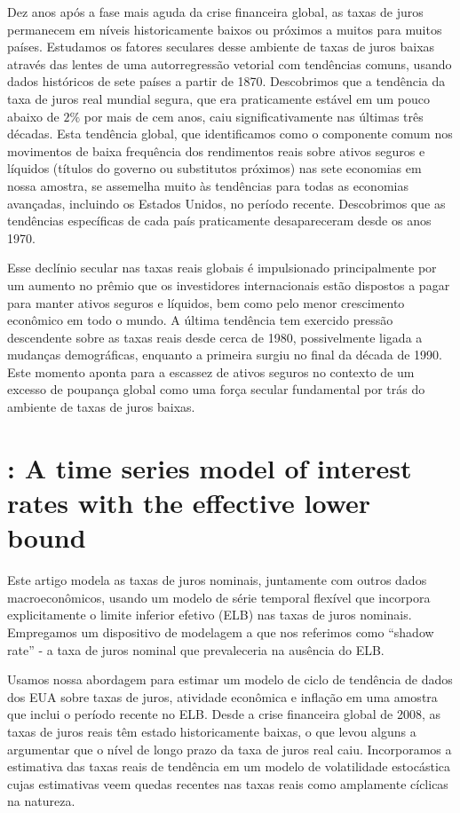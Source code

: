 Dez anos após a fase mais aguda da crise financeira global, as taxas de juros permanecem em níveis historicamente baixos ou próximos a muitos para muitos países. Estudamos os fatores seculares desse ambiente de taxas de juros baixas através das lentes de uma autorregressão vetorial com tendências comuns, usando dados históricos de sete países a partir de 1870. Descobrimos que a tendência da taxa de juros real mundial segura, que era praticamente estável em um pouco abaixo de $2\%$ por mais de cem anos, caiu significativamente nas últimas três décadas. Esta tendência global, que identificamos como o componente comum nos movimentos de baixa frequência dos rendimentos reais sobre ativos seguros e líquidos (títulos do governo ou substitutos próximos) nas sete economias em nossa amostra, se assemelha muito às tendências para todas as economias avançadas, incluindo os Estados Unidos, no período recente. Descobrimos que as tendências específicas de cada país praticamente desapareceram desde os anos 1970.

Esse declínio secular nas taxas reais globais é impulsionado principalmente por um aumento no prêmio que os investidores internacionais estão dispostos a pagar para manter ativos seguros e líquidos, bem como pelo menor crescimento econômico em todo o mundo. A última tendência tem exercido pressão descendente sobre as taxas reais desde cerca de 1980, possivelmente ligada a mudanças demográficas, enquanto a primeira surgiu no final da década de 1990. Este momento aponta para a escassez de ativos seguros no contexto de um excesso de poupança global como uma força secular fundamental por trás do ambiente de taxas de juros baixas.
%
%
\section{\citet{Johannsen:2018}: A time series model of interest rates with the effective lower bound}
Este artigo modela as taxas de juros nominais, juntamente com outros dados macroeconômicos, usando um modelo de série temporal flexível que incorpora explicitamente o limite inferior efetivo (ELB) nas taxas de juros nominais. Empregamos um dispositivo de modelagem a que nos referimos como “shadow rate” - a taxa de juros nominal que prevaleceria na ausência do ELB.

Usamos nossa abordagem para estimar um modelo de ciclo de tendência de dados dos EUA sobre taxas de juros, atividade econômica e inflação em uma amostra que inclui o período recente no ELB. Desde a crise financeira global de 2008, as taxas de juros reais têm estado historicamente baixas, o que levou alguns a argumentar que o nível de longo prazo da taxa de juros real caiu. Incorporamos a estimativa das taxas reais de tendência em um modelo de volatilidade estocástica cujas estimativas veem quedas recentes nas taxas reais como amplamente cíclicas
na natureza.

